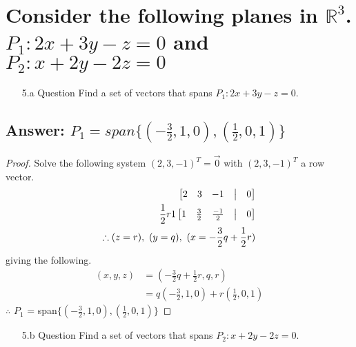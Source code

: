 \documentclass[11pt]{article}
\begin{document}
\section{Consider the following planes in $\mathbb{R}^3$. $P_1: 2x + 3y - z = 0$ and $P_2: x + 2y - 2z = 0$}
\begin{enumerate}
        \item[5.a]Question Find a set of vectors that spans $P_1: 2x + 3y - z = 0$.
\end{enumerate}
\subsection{Answer: $P_1 = span\{(-\frac{3}{2}, 1, 0), (\frac{1}{2}, 0, 1)\}$}
\begin{proof}
        Solve the following system $(2, 3, -1)^{T} = \vec{0}$ with $(2, 3, -1)^{T}$ a row vector.
        \begin{align*}
                \begin{bmatrix}
                        2 & 3 & -1 & \bigm| & 0 \\
                \end{bmatrix}
                \\ \frac{1}{2} r1
                \begin{bmatrix}
                        1 & \frac{3}{2} & \frac{-1}{2} & \bigm| & 0 \\
                \end{bmatrix}
                \\
                \therefore (z=r),\ (y=q),\ (x=-\frac{3}{2}q+\frac{1}{2}r)
        \end{align*}
        giving the following.
        \begin{align*}
                (x,y,z) & = (-\frac{3}{2}q+\frac{1}{2}r, q, r)           \\
                        & = q(-\frac{3}{2}, 1, 0) + r(\frac{1}{2}, 0, 1)
        \end{align*}
        $\therefore$ $P_1$ = span$\{(-\frac{3}{2}, 1, 0), (\frac{1}{2}, 0, 1)\}$
\end{proof}
\begin{enumerate}
        \item[5.b]Question Find a set of vectors that spans $P_2: x + 2y - 2z = 0$.
\end{enumerate}
\end{document}

